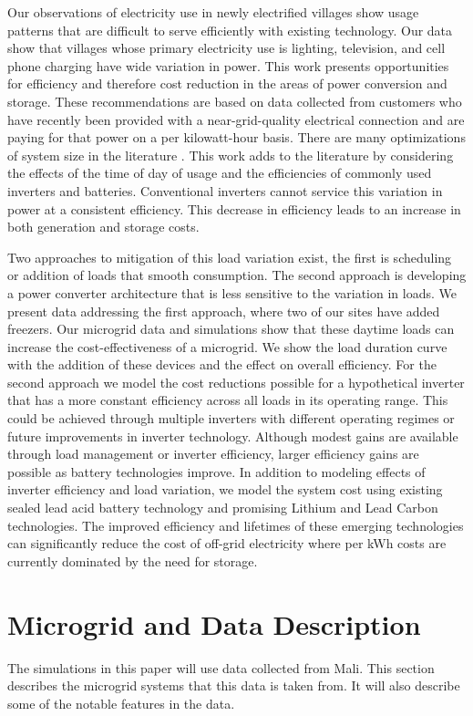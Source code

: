 \documentclass[conference]{IEEEtran}
\begin{document}
Our observations of electricity use in newly electrified villages
show usage patterns that are difficult to serve efficiently 
with existing technology.
Our data show that villages whose primary electricity use is 
lighting, television, and cell phone charging have wide variation
in power.
This work presents opportunities for efficiency and therefore
cost reduction in the areas of power conversion and storage.
These recommendations are based on data collected from customers
who have recently been provided with a near-grid-quality
electrical connection and are paying for that power on a
per kilowatt-hour basis.
There are many optimizations of system size in the literature
\cite{optimizations}.
This work adds to the literature by considering the effects
of the time of day of usage and the efficiencies of commonly
used inverters and batteries.
Conventional inverters cannot service this variation in power
at a consistent efficiency.
This decrease in efficiency leads to an increase in both
generation and storage costs.

Two approaches to mitigation of this load variation exist, 
the first is scheduling or addition of loads that smooth consumption.
The second approach is developing a power converter architecture
that is less sensitive to the variation in loads.
We present data addressing the first approach, where two of our 
sites have added freezers.
Our microgrid data and simulations show that these daytime loads
can increase the cost-effectiveness of a microgrid.
We show the load duration curve with the addition of these 
devices and the effect on overall efficiency.
For the second approach we model the cost reductions possible
for a hypothetical inverter that has a more constant efficiency
across all loads in its operating range.
This could be achieved through multiple inverters with 
different operating regimes or future improvements in inverter
technology.
Although modest gains are available through load management or 
inverter efficiency, larger efficiency
gains are possible as battery technologies improve.
In addition to modeling effects of inverter efficiency and load 
variation, we model the system cost using existing sealed lead acid 
battery technology and promising Lithium and Lead Carbon
technologies.
The improved efficiency and lifetimes of these emerging technologies
can significantly reduce the cost of off-grid electricity
where per kWh costs are currently dominated by the need
for storage.


\section{Microgrid and Data Description}
The simulations in this paper will use data collected from 
Mali.
This section describes the microgrid systems that this data
is taken from.
It will also describe some of the notable features in the data.
\end{document}
